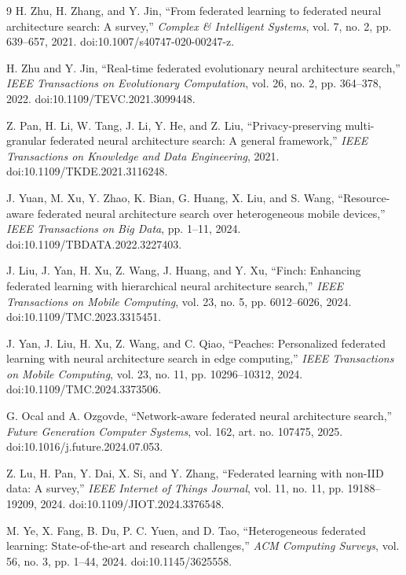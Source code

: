 \documentclass[11pt]{article}
\begin{document}
\begin{thebibliography}{9}
H. Zhu, H. Zhang, and Y. Jin,
``From federated learning to federated neural architecture search: A survey,''
\emph{Complex \& Intelligent Systems}, vol. 7, no. 2, pp. 639--657, 2021.
doi:10.1007/s40747-020-00247-z.

H. Zhu and Y. Jin,
``Real-time federated evolutionary neural architecture search,''
\emph{IEEE Transactions on Evolutionary Computation}, vol. 26, no. 2,
pp. 364--378, 2022. doi:10.1109/TEVC.2021.3099448.

Z. Pan, H. Li, W. Tang, J. Li, Y. He, and Z. Liu,
``Privacy-preserving multi-granular federated neural architecture search: A general framework,''
\emph{IEEE Transactions on Knowledge and Data Engineering}, 2021.
doi:10.1109/TKDE.2021.3116248.

J. Yuan, M. Xu, Y. Zhao, K. Bian, G. Huang, X. Liu, and S. Wang,
``Resource-aware federated neural architecture search over heterogeneous mobile devices,''
\emph{IEEE Transactions on Big Data}, pp. 1--11, 2024.
doi:10.1109/TBDATA.2022.3227403.

J. Liu, J. Yan, H. Xu, Z. Wang, J. Huang, and Y. Xu,
``Finch: Enhancing federated learning with hierarchical neural architecture search,''
\emph{IEEE Transactions on Mobile Computing}, vol. 23, no. 5,
pp. 6012--6026, 2024. doi:10.1109/TMC.2023.3315451.

J. Yan, J. Liu, H. Xu, Z. Wang, and C. Qiao,
``Peaches: Personalized federated learning with neural architecture search in edge computing,''
\emph{IEEE Transactions on Mobile Computing}, vol. 23, no. 11,
pp. 10296--10312, 2024. doi:10.1109/TMC.2024.3373506.

G. Ocal and A. Ozgovde,
``Network-aware federated neural architecture search,''
\emph{Future Generation Computer Systems}, vol. 162, art. no. 107475,
2025. doi:10.1016/j.future.2024.07.053.

Z. Lu, H. Pan, Y. Dai, X. Si, and Y. Zhang,
``Federated learning with non-IID data: A survey,''
\emph{IEEE Internet of Things Journal}, vol. 11, no. 11,
pp. 19188--19209, 2024. doi:10.1109/JIOT.2024.3376548.

M. Ye, X. Fang, B. Du, P. C. Yuen, and D. Tao,
``Heterogeneous federated learning: State-of-the-art and research challenges,''
\emph{ACM Computing Surveys}, vol. 56, no. 3, pp. 1--44, 2024.
doi:10.1145/3625558.


\end{thebibliography}
\end{document}

